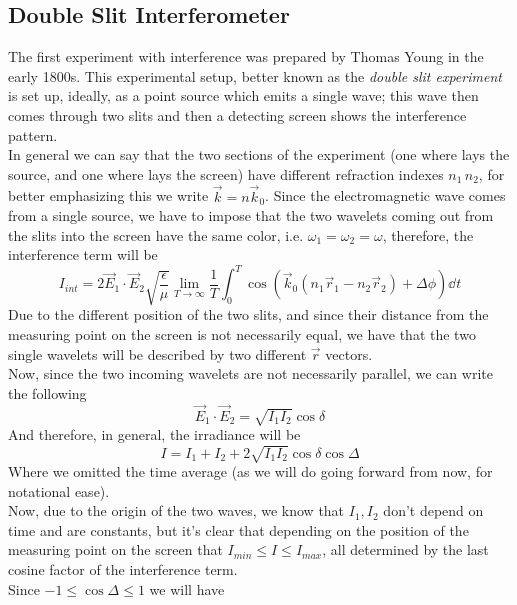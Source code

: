 \documentclass[../electromagnetism.tex]{subfiles}
\begin{document}
\subsection{Double Slit Interferometer}
The first experiment with interference was prepared by Thomas Young in the early 1800s. This experimental setup, better known as the \textit{double slit experiment} is set up, ideally, as a point source which emits a single wave; this wave then comes through two slits and then a detecting screen shows the interference pattern.\\
In general we can say that the two sections of the experiment (one where lays the source, and one where lays the screen) have different refraction indexes $n_1\, n_2$, for better emphasizing this we write $\vec{k}=n\vec{k}_0$.
Since the electromagnetic wave comes from a single source, we have to impose that the two wavelets coming out from the slits into the screen have the same color, i.e. $\omega_1=\omega_2=\omega$, therefore, the interference term will be
\begin{equation*}
	I_{int}=2\vec{E}_1\cdot\vec{E}_2\sqrt{\frac{\epsilon}{\mu}}\lim_{T\to\infty}\frac{1}{T}\int_{0}^{T}\cos\left( \vec{k}_0\left( n_1\vec{r}_1-n_2\vec{r}_2 \right)+\Delta\phi \right)\dd^{}{t}
\end{equation*}
Due to the different position of the two slits, and since their distance from the measuring point on the screen is not necessarily equal, we have that the two single wavelets will be described by two different $\vec{r}$ vectors.\\
Now, since the two incoming wavelets are not necessarily parallel, we can write the following
\begin{equation*}
	\vec{E}_1\cdot\vec{E}_2=\sqrt{I_1I_2}\cos\delta
\end{equation*}
And therefore, in general, the irradiance will be
\begin{equation}
	I=I_1+I_2+2\sqrt{I_1I_2}\cos\delta\cos\Delta
	\label{eq:youngintesity.yint}
\end{equation}
Where we omitted the time average (as we will do going forward from now, for notational ease).\\
Now, due to the origin of the two waves, we know that $I_1, I_2$ don't depend on time and are constants, but it's clear that depending on the position of the measuring point on the screen that $I_{min}\le I\le I_{max}$, all determined by the last cosine factor of the interference term.\\
Since $-1\le\cos\Delta\le1$ we will have
\end{document}
